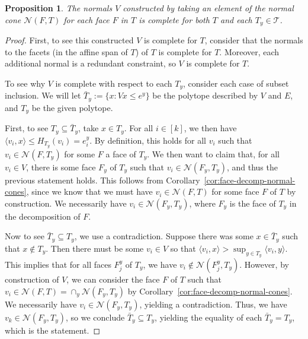 \documentclass[12pt]{article}
\newcommand{\N}{\mathcal{N}}
\newcommand{\T}{\mathcal{T}}
\newcommand{\inprod}[2]{\langle #1, #2 \rangle}%
\newtheorem{proposition}{Proposition}
\begin{document}
  \begin{proposition}\label{prop:complete-V}
  	The normals $V$ constructed by taking an element of the normal cone $\N(F, T)$ for each face $F$ in $T$ is complete for both $T$ and each $T_y \in \T$.
  \end{proposition}
  \begin{proof}
  	First, to see this constructed $V$ is complete for $T$, consider that the normals to the facets (in the affine span of $T$) of $T$ is complete for $T$.
  	Moreover, each additional normal is a redundant constraint, so
  	$V$ is complete for $T$.
  	
  	To see why $V$ is complete with respect to each $T_y$, consider each case of subset inclusion.
  	We will let $\bar T_y := \{ x : Vx \leq e^y\}$ be the polytope described by $V$ and $E$, and $T_y$ be the given polytope.
  	
  	First,  to see $T_y \subseteq \bar T_y$, take $x \in T_y$.
  	For all $i \in [k]$, we then have $\inprod{v_i}{x} \leq H_{T_y}(v_i) = e^y_i$.
  	By definition, this holds for all $v_i$ such that $v_i \in \N(F, T_y)$ for some $F$ a face of $T_y$.
  	We then want to claim that, for all $v_i \in V$, there is some face $F_y$ of $T_y$ such that $v_i \in \N(F_y, T_y)$, and thus the previous statement holds.
  	This follows from Corollary~\ref{cor:face-decomp-normal-cones}, since we know that we must have $v_i \in \N(F, T)$ for some face $F$ of $T$ by construction.
  	We necessarily have $v_i \in \N(F_y, T_y)$, where $F_y$ is the face of $T_y$ in the decomposition of $F$.
  	
  	Now to see $\bar T_y \subseteq T_y$, we use a contradiction.
  	Suppose there was some $x \in \bar T_y$ such that $x \not \in T_y$.
  	Then there must be some $v_i \in V$ so that $\inprod {v_i}{x} > \sup_{y \in T_y} \inprod{v_i}{y}$.
  	This implies that for all faces $F_{j}^y$ of $T_y$, we have $v_i \not \in \N(F_{j}^y, T_y)$.
  	However, by construction of $V$, we can consider the face $F$ of $T$ such that $v_i \in \N(F,T) = \cap_y \N(F_y, T_y)$ by Corollary~\ref{cor:face-decomp-normal-cones}.
  	We necessarily have $v_i \in \N(F_y, T_y)$, yielding a contradiction.
  	Thus, we have $v_k \in \N(F_y, T_y)$, so we conclude $\bar T_y \subseteq T_y$, yielding the equality of each $\bar T_y = T_y$, which is the statement.
  \end{proof}
  
\end{document}
